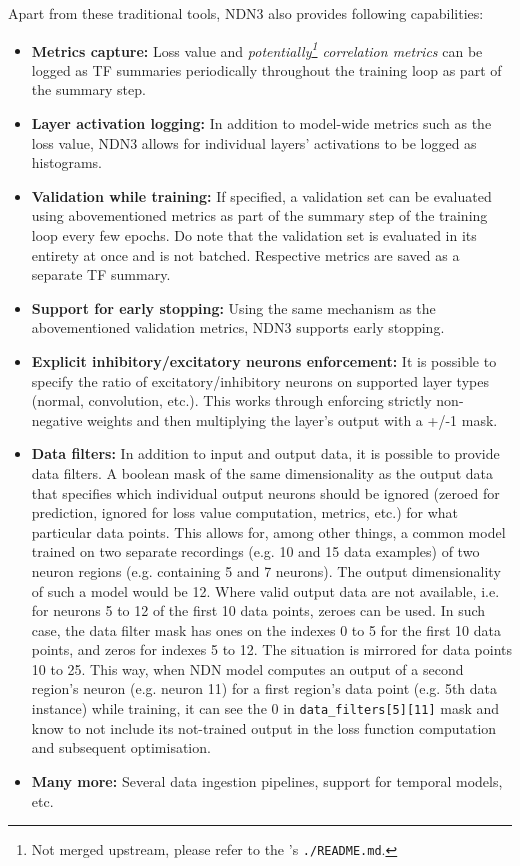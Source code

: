 Apart from these traditional tools, NDN3 also provides following capabilities:

\begin{itemize}
    \item \textbf{Metrics capture:} Loss value and \textit{potentially\footnote{Not merged upstream, please refer to the 's \texttt{./README.md}.} correlation metrics} can be logged as TF summaries periodically throughout the training loop as part of the summary step.
    
    \item \textbf{Layer activation logging:}  In addition to model-wide metrics such as the loss value, NDN3 allows for individual layers’ activations to be logged as histograms.
    
    \item \textbf{Validation while training:} If specified, a validation set can be evaluated using abovementioned metrics as part of the summary step of the training loop every few epochs. Do note that the validation set is evaluated in its entirety at once and is not batched. Respective metrics are saved as a separate TF summary.
    
    \item \textbf{Support for early stopping:} Using the same mechanism as the abovementioned validation metrics, NDN3 supports early stopping.
    
    \item \textbf{Explicit inhibitory/excitatory neurons enforcement:} It is possible to specify the ratio of excitatory/inhibitory neurons on supported layer types (normal, convolution, etc.). This works through enforcing strictly non-negative weights and then multiplying the layer’s output with a +/-1 mask.
    
    \item \textbf{Data filters:} In addition to input and output data, it is possible to provide data filters. A boolean mask of the same dimensionality as the output data that specifies which individual output neurons should be ignored (zeroed for prediction, ignored for loss value computation, metrics, etc.) for what particular data points. This allows for, among other things, a common model trained on two separate recordings (e.g. 10 and 15 data examples) of two neuron regions (e.g. containing 5 and 7 neurons). The output dimensionality of such a model would be 12. Where valid output data are not available, i.e. for neurons 5 to 12 of the first 10 data points, zeroes can be used. In such case, the data filter mask has ones on the indexes 0 to 5 for the first 10 data points, and zeros for indexes 5 to 12. The situation is mirrored for data points 10 to 25. This way, when NDN model computes an output of a second region’s neuron (e.g. neuron 11) for a first region’s data point (e.g. 5th data instance) while training, it can see the 0 in \texttt{data\_filters[5][11]} mask and know to not include its not-trained output in the loss function computation and subsequent optimisation.
    
    \item \textbf{Many more:} Several data ingestion pipelines, support for temporal models, etc.
\end{itemize}

